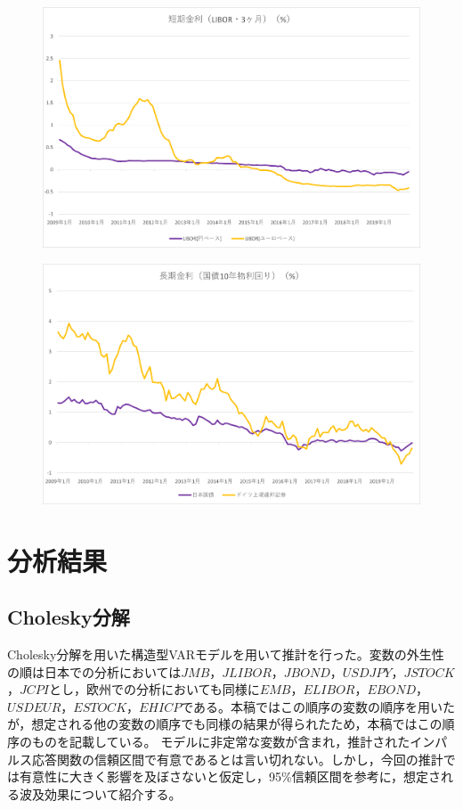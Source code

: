 \documentclass[12pt]{jarticle}
\begin{document}
{\newpage
\begin{figure}[!htbp]
  \centering
  \includegraphics[width=16cm]{libor09.png}
\end{figure}
\begin{figure}[!htbp]
  \centering
  \includegraphics[width=16cm]{bond09.png}
\end{figure}
\newpage

\section{分析結果}

\subsection{Cholesky分解}

Cholesky分解を用いた構造型VARモデルを用いて推計を行った。変数の外生性の順は日本での分析においては$JMB$，$JLIBOR$，$JBOND$，$USDJPY$，$JSTOCK$，$JCPI$とし，欧州での分析においても同様に$EMB$，$ELIBOR$，$EBOND$，$USDEUR$，$ESTOCK$，$EHICP$である。本稿ではこの順序の変数の順序を用いたが，想定される他の変数の順序でも同様の結果が得られたため，本稿ではこの順序のものを記載している。
モデルに非定常な変数が含まれ，推計されたインパルス応答関数の信頼区間で有意であるとは言い切れない。しかし，今回の推計では有意性に大きく影響を及ぼさないと仮定し，95\%信頼区間を参考に，想定される波及効果について紹介する。

}
\end{document}
